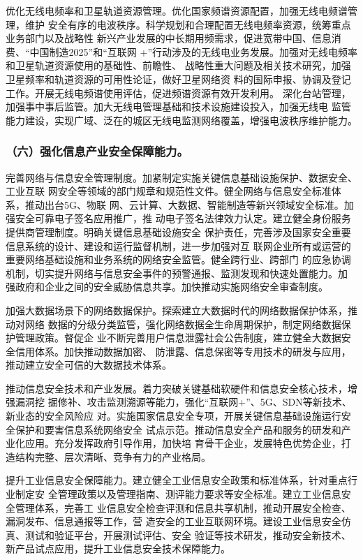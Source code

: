 \documentclass[11pt]{ctexart}
\begin{document}
{{{{优化无线电频率和卫星轨道资源管理。优化国家频谱资源配置，加强无线电频谱管理，维护
安全有序的电波秩序。科学规划和合理配置无线电频率资源，统筹重点业务部门以及战略性
新兴产业发展的中长期用频需求，促进宽带中国、信息消费、“中国制造2025”和“互联网
+”行动涉及的无线电业务发展。加强对无线电频率和卫星轨道资源使用的基础性、前瞻性、
战略性重大问题及相关技术研究，加强卫星频率和轨道资源的可用性论证，做好卫星网络资
料的国际申报、协调及登记工作。开展无线电频谱使用评估，促进频谱资源有效开发利用。
深化台站管理，加强事中事后监管。加大无线电管理基础和技术设施建设投入，加强无线电
监管能力建设，实现广域、泛在的城区无线电监测网络覆盖，增强电波秩序维护能力。

\subsubsection{（六）强化信息产业安全保障能力。}
\label{sec:orgfe49bd1}

完善网络与信息安全管理制度。加紧制定实施关键信息基础设施保护、数据安全、工业互联
网安全等领域的部门规章和规范性文件。健全网络与信息安全标准体系，推动出台5G、物联
网、云计算、大数据、智能制造等新兴领域安全标准。加强安全可靠电子签名应用推广，推
动电子签名法律效力认定。建立健全身份服务提供商管理制度。明确关键信息基础设施安全
保护责任，完善涉及国家安全重要信息系统的设计、建设和运行监督机制，进一步加强对互
联网企业所有或运营的重要网络基础设施和业务系统的网络安全监管。健全跨行业、跨部门
的应急协调机制，切实提升网络与信息安全事件的预警通报、监测发现和快速处置能力。加
强政府和企业之间的安全威胁信息共享。加快推动实施网络安全审查制度。

加强大数据场景下的网络数据保护。探索建立大数据时代的网络数据保护体系，推动对网络
数据的分级分类监管，强化网络数据全生命周期保护，制定网络数据保护管理政策。督促企
业不断完善用户信息泄露社会公告制度，建立健全大数据安全信用体系。加快推动数据加密、
防泄露、信息保密等专用技术的研发与应用，推动建立安全可信的大数据技术体系。

推动信息安全技术和产业发展。着力突破关键基础软硬件和信息安全核心技术，增强漏洞挖
掘修补、攻击监测溯源等能力，强化“互联网+”、5G、SDN等新技术、新业态的安全风险应
对。实施国家信息安全专项，开展关键信息基础设施运行安全保护和要害信息系统网络安全
试点示范。推动信息安全产品和服务的研发和产业化应用。充分发挥政府引导作用，加快培
育骨干企业，发展特色优势企业，打造结构完整、层次清晰、竞争有力的产业格局。

提升工业信息安全保障能力。建立健全工业信息安全政策和标准体系，针对重点行业制定安
全管理政策以及管理指南、测评能力要求等安全标准。建立工业信息安全管理体系，完善工
业信息安全检查评测和信息共享机制，推动开展安全检查、漏洞发布、信息通报等工作，营
造安全的工业互联网环境。建设工业信息安全仿真、测试和验证平台，开展测试评估、安全
验证等技术研发，推动安全新技术、新产品试点应用，提升工业信息安全技术保障能力。


}}}}
\end{document}

